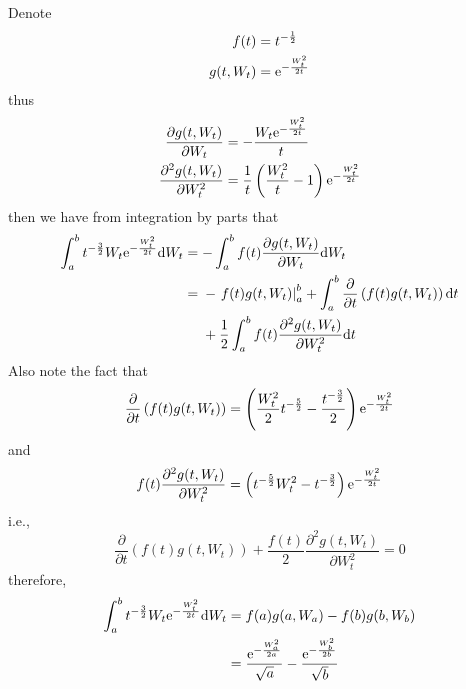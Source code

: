 \documentclass{homework}
\begin{document}
    \problem
    Denote
    \[\begin{aligned}
        f(t)&=t^{-\frac{1}{2}}\\
        g(t,W_t)&=\mathrm e^{-\frac{W_t^2}{2t}}
    \end{aligned}\]
    thus
    \[\begin{aligned}
        \frac{\partial g(t,W_t)}{\partial W_t}
        &=-\frac{W_t\mathrm e^{-\frac{W_t^2}{2t}}}{t}\\
        \frac{\partial^2 g(t,W_t)}{\partial W_t^2}
        &=\frac{1}{t}\left(\frac{W_t^2}{t}-1\right)\mathrm e^{-\frac{W_t^2}{2t}}
    \end{aligned}\]
    then we have from integration by parts that
    \[\begin{aligned}
        \int_a^bt^{-\frac{3}{2}}W_t\mathrm e^{-\frac{W_t^2}{2t}}\mathrm d W_t
        &=-\int_a^bf(t)\frac{\partial g(t,W_t)}{\partial W_t}\mathrm d W_t\\
        &=\begin{aligned}[t]
        &-\left.f(t)g(t,W_t)\right|_a^b
         +\int_a^b\frac{\partial}{\partial t}\left(f(t)g(t,W_t)\right)\mathrm d t\\
        &+\frac{1}{2}\int_a^bf(t)\frac{\partial^2g(t,W_t)}{\partial W_t^2}\mathrm d t
        \end{aligned}
    \end{aligned}\]
    Also note the fact that
    \[\frac{\partial}{\partial t}\left(f(t)g(t,W_t)\right)
    =\left(\frac{W_t^2}{2}t^{-\frac{5}{2}}-\frac{t^{-\frac{3}{2}}}{2}\right)
    \mathrm e^{-\frac{W_t^2}{2t}}\]
    and
    \[f(t)\frac{\partial^2g(t,W_t)}{\partial W_t^2}
    =\left(t^{-\frac{5}{2}}W_t^2-t^{-\frac{3}{2}}\right)\mathrm e^{-\frac{W_t^2}{2t}}\]
    i.e.,
    \[\frac{\partial}{\partial t}\left(f(t)g(t,W_t)\right)
    +\frac{f(t)}{2}\frac{\partial^2g(t,W_t)}{\partial W_t^2}=0\]
    therefore,
    \[\begin{aligned}
        \int_a^bt^{-\frac{3}{2}}W_t\mathrm e^{-\frac{W_t^2}{2t}}\mathrm d W_t
        &=f(a)g(a,W_a)-f(b)g(b,W_b)\\
        &=\frac{\mathrm e^{-\frac{W_a^2}{2a}}}{\sqrt a}
        -\frac{\mathrm e^{-\frac{W_b^2}{2b}}}{\sqrt b}
    \end{aligned}\]
\end{document}
